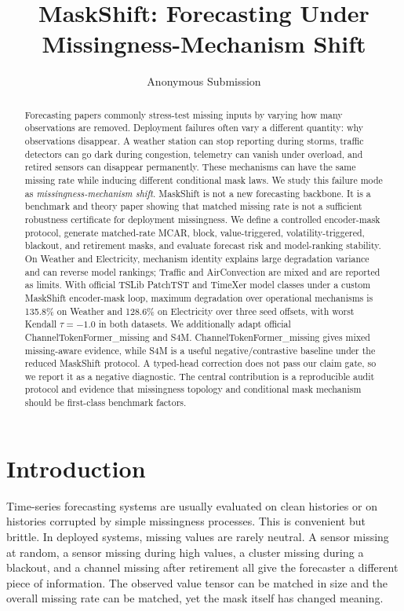 \documentclass[letterpaper,twocolumn,10pt]{article}
\title{MaskShift: Forecasting Under Missingness-Mechanism Shift}
\author{Anonymous Submission}
\date{}
\begin{document}
\maketitle

\begin{abstract}
Forecasting papers commonly stress-test missing inputs by varying how many observations are removed. Deployment failures often vary a different quantity: why observations disappear. A weather station can stop reporting during storms, traffic detectors can go dark during congestion, telemetry can vanish under overload, and retired sensors can disappear permanently. These mechanisms can have the same missing rate while inducing different conditional mask laws. We study this failure mode as \emph{missingness-mechanism shift}. MaskShift is not a new forecasting backbone. It is a benchmark and theory paper showing that matched missing rate is not a sufficient robustness certificate for deployment missingness. We define a controlled encoder-mask protocol, generate matched-rate MCAR, block, value-triggered, volatility-triggered, blackout, and retirement masks, and evaluate forecast risk and model-ranking stability. On Weather and Electricity, mechanism identity explains large degradation variance and can reverse model rankings; Traffic and AirConvection are mixed and are reported as limits. With official TSLib PatchTST and TimeXer model classes under a custom MaskShift encoder-mask loop, maximum degradation over operational mechanisms is 135.8\% on Weather and 128.6\% on Electricity over three seed offsets, with worst Kendall $\tau=-1.0$ in both datasets. We additionally adapt official ChannelTokenFormer\_missing and S4M. ChannelTokenFormer\_missing gives mixed missing-aware evidence, while S4M is a useful negative/contrastive baseline under the reduced MaskShift protocol. A typed-head correction does not pass our claim gate, so we report it as a negative diagnostic. The central contribution is a reproducible audit protocol and evidence that missingness topology and conditional mask mechanism should be first-class benchmark factors.
\end{abstract}

\section{Introduction}

Time-series forecasting systems are usually evaluated on clean histories or on histories corrupted by simple missingness processes. This is convenient but brittle. In deployed systems, missing values are rarely neutral. A sensor missing at random, a sensor missing during high values, a cluster missing during a blackout, and a channel missing after retirement all give the forecaster a different piece of information. The observed value tensor can be matched in size and the overall missing rate can be matched, yet the mask itself has changed meaning.
\end{document}

